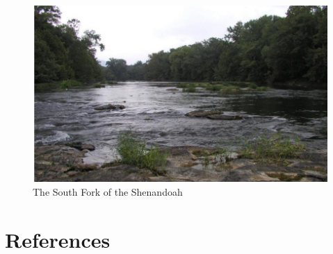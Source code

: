 \documentclass[
  12pt,
]{article}
\begin{document}
\begin{figure}
\centering
\includegraphics{../Figures-and-Maps/Pano_ShenandoahRiver.jpeg}
\caption{The South Fork of the Shenandoah}
\end{figure}

\newpage

\hypertarget{references}{%
\section{References}\label{references}}
\end{document}
